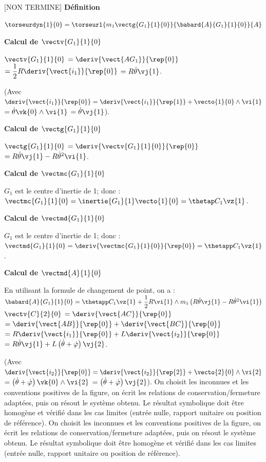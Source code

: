 \begin{corrigebox}
[NON TERMINE]
\textbf{Définition}

$\torseurdyn{1}{0} = \torseurl{m_1 \vectg{G_1}{1}{0}}{\babard{A}{G_1}{1}{0}}{A}$

\textbf{Calcul de $\vectv{G_1}{1}{0}$}

$\vectv{G_1}{1}{0}$ $ = \deriv{\vect{AG_1}}{\rep{0}}$
$ = \dfrac{1}{2}R\deriv{\vect{i_1}}{\rep{0}}$
$ = R\dot{\theta}\vj{1}$.

(Avec $\deriv{\vect{i_1}}{\rep{0}} = \deriv{\vect{i_1}}{\rep{1}} + \vecto{1}{0}\wedge \vi{1}$
$ = \dot{\theta}\vk{0}\wedge \vi{1}$ $ = \dot{\theta}\vj{1}$).

\textbf{Calcul de $\vectg{G_1}{1}{0}$}

$\vectg{G_1}{1}{0}$ $ = \deriv{{\vectv{G_1}{1}{0}}}{\rep{0}}$
$ =  R\ddot{\theta}\vj{1} - R\dot{\theta}^2\vi{1} $.

\textbf{Calcul de $\vectmc{G_1}{1}{0}$}

$G_1$ est le centre d'inertie de 1; donc : 
$\vectmc{G_1}{1}{0} = \inertie{G_1}{1}\vecto{1}{0} = \thetap C_1 \vz{1}$.

\textbf{Calcul de $\vectmd{G_1}{1}{0}$}

$G_1$ est le centre d'inertie de 1; donc : 
$\vectmd{G_1}{1}{0} = \deriv{\vectmc{G_1}{1}{0}}{\rep{0}} = \thetapp C_1 \vz{1}$.

\textbf{Calcul de $\vectmd{A}{1}{0}$}

En utilisant la formule de changement de point, on a : 
$\babard{A}{G_1}{1}{0} = \thetapp C_1 \vz{1} + \dfrac{1}{2}R\vi{1} \wedge m_1 \left( R\ddot{\theta}\vj{1} - R\dot{\theta}^2\vi{1}\right)$
$\vectv{C}{2}{0}$ $ = \deriv{\vect{AC}}{\rep{0}}$
$ = \deriv{\vect{AB}}{\rep{0}}+\deriv{\vect{BC}}{\rep{0}}$
$ = R\deriv{\vect{i_1}}{\rep{0}}+L\deriv{\vect{i_2}}{\rep{0}}$
$ = R\dot{\theta}\vj{1}+L\left( \dot{\theta}+\dot{\varphi}\right)\vj{2}$.

(Avec $\deriv{\vect{i_2}}{\rep{0}} = \deriv{\vect{i_2}}{\rep{2}} + \vecto{2}{0}\wedge \vi{2}$
$ = \left( \dot{\theta}+\dot{\varphi}\right)\vk{0}\wedge \vi{2}$ $ = \left( \dot{\theta}+\dot{\varphi}\right)\vj{2}$).
On choisit les inconnues et les conventions positives de la figure,
        on écrit les relations de conservation/fermeture adaptées, puis on résout le
        système obtenu. Le résultat symbolique doit être homogène et vérifié dans les cas
        limites (entrée nulle, rapport unitaire ou position de référence).
On choisit les inconnues et les conventions positives de la figure,
        on écrit les relations de conservation/fermeture adaptées, puis on résout le
        système obtenu. Le résultat symbolique doit être homogène et vérifié dans les cas
        limites (entrée nulle, rapport unitaire ou position de référence).
\end{corrigebox}
